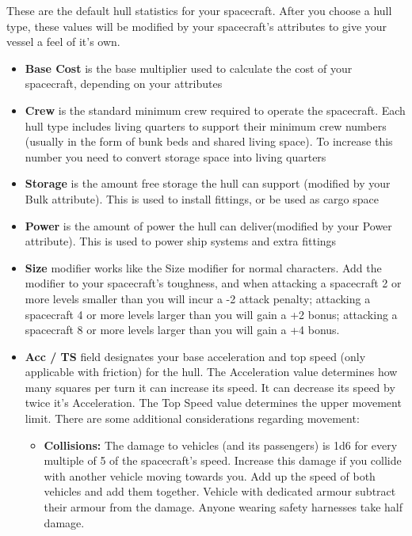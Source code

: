 \begin{multicols}{2}

These are the default hull statistics for your spacecraft. After you choose a hull type, these values will be modified by your spacecraft's attributes to give your vessel a feel of it's own.

\begin{itemize}
  \item \textbf{Base Cost} is the base multiplier used to calculate the cost of your spacecraft, depending on your attributes
  \item \textbf{Crew} is the standard minimum crew required to operate the spacecraft. Each hull type includes living quarters to support their minimum crew numbers (usually in the form of bunk beds and shared living space). To increase this number you need to convert storage space into living quarters
  \item \textbf{Storage} is the amount free storage the hull can support (modified by your Bulk attribute). This is used to install fittings, or be used as cargo space
  \item \textbf{Power} is the amount of power the hull can deliver(modified by your Power attribute). This is used to power ship systems and extra fittings
  \item \textbf{Size} modifier works like the Size modifier for normal characters. Add the modifier to your spacecraft's toughness, and when attacking a spacecraft 2 or more levels smaller than you will incur a -2 attack penalty; attacking a spacecraft 4 or more levels larger than you will gain a +2 bonus; attacking a spacecraft 8 or more levels larger than you will gain a +4 bonus.
  \item \textbf{Acc / TS} field designates your base acceleration and top speed (only applicable with friction) for the hull. The Acceleration value determines how many squares per turn it can increase its speed. It can decrease its speed by twice it's Acceleration. The Top Speed value determines the upper movement limit. There are some additional considerations regarding movement:
  \begin{itemize}
    \item \textbf{Collisions:} The damage to vehicles (and its passengers) is 1d6 for every multiple of 5 of the spacecraft's speed. Increase this damage if you collide with another vehicle moving towards you. Add up the speed of both vehicles and add them together. Vehicle with dedicated armour subtract their armour from the damage. Anyone wearing safety harnesses take half damage.

\end{itemize}
\end{itemize}
\end{multicols}
